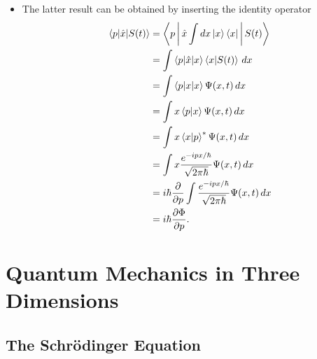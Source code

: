 \documentclass{article}
\begin{document}
\begin{itemize}
  \item The latter result can be obtained by inserting the identity operator \begin{align*}
          \braket{p | \hat{x} | S(t)} & = \Braket{p | \hat{x} \int d x \Ket{x} \Bra{x} | S(t)}                                                    \\
                                      & = \int \braket{p | \hat{x} | x} \braket{x | S(t)} \,d x                                                   \\
                                      & = \int \braket{p | x | x} \Psi(x, t) \,d x                                                                \\
                                      & = \int x \braket{p | x} \Psi(x, t) \,d x                                                                  \\
                                      & = \int x \braket{x | p}^* \Psi(x, t) \,d x                                                                \\
                                      & = \int x \frac{e^{-i p x / \hbar}}{\sqrt{2 \pi \hbar}} \Psi(x, t) \,d x                                   \\
                                      & = i \hbar \frac{\partial}{\partial p} \int \frac{e^{-i p x / \hbar}}{\sqrt{2 \pi \hbar}} \Psi(x, t) \,d x \\
                                      & = i \hbar \frac{\partial \Phi}{\partial p}.
        \end{align*}
\end{itemize}

\section{Quantum Mechanics in Three Dimensions}

\subsection{The Schrödinger Equation}
\end{document}
